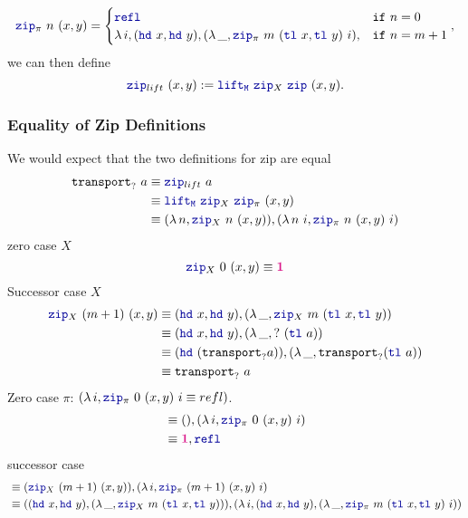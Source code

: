 \documentclass[twoside,11pt,openright]{report}
\theoremstyle{plain} %
\theoremstyle{definition}
\theoremstyle{remark}
\newcommand*{\type}[1]{\textcolor{magenta!90!black}{#1}}
\newcommand*{\unit}{\type{\textbf{1}}}
\newcommand*{\function}[1]{\textcolor{blue!60!black}{\ensuremath{\mathtt{#1}}}}
\begin{document}
\begin{equation}
  \function{zip}_{\pi}~n~(x , y) = \begin{cases} \function{refl} & \mathtt{if}~n = 0 \\ \lambda\,i,(\function{hd}~x , \function{hd}~y) , (\lambda\,\_, \function{zip}_{\pi}~m~(\function{tl}~x,\function{tl}~y)~i) , & \mathtt{if}~n = m + 1 \end{cases},
\end{equation}
we can then define
\begin{equation}
  \function{zip}_{lift}~(x , y) := \function{lift_M}~\function{zip}_X~\function{zip}~(x,y).
\end{equation}
\subsubsection{Equality of Zip Definitions}
We would expect that the two definitions for zip are equal
\begin{align}
  \texttt{transport}_{?}~a &\equiv \function{zip}_{lift}~a \\
                           &\equiv \function{lift_M}~\function{zip}_X~\function{zip}_\pi~(x,y) \\
                           &\equiv (\lambda\,n, \function{zip}_X~n~(x,y)) , (\lambda\,n~i, \function{zip}_\pi~n~(x,y)~i)
\end{align}
zero case \(X\)
\begin{equation}
  \function{zip}_X~0~(x,y) \equiv \unit
\end{equation}
Successor case \(X\)
\begin{align} 
  \function{zip}_X~(m+1)~(x,y) &\equiv (\function{hd}~x, \function{hd}~y),(\lambda\,\_,\function{zip}_X~m~(\function{tl}~x,\function{tl}~y)) \\
                               &\equiv (\function{hd}~x, \function{hd}~y),(\lambda\,\_, {?}~(\function{tl}~a)) \\
                               &\equiv (\function{hd}~(\texttt{transport}_{?} a)),(\lambda\,\_, \texttt{transport}_{?} (\function{tl}~a)) \\
                               &\equiv \mathtt{transport}_?~a \\
\end{align}
Zero case \(\pi\): \((\lambda\,i, \function{zip}_\pi~0~(x,y)~i \equiv refl)\).
\begin{align}
  &\equiv () , (\lambda\,i, \function{zip}_\pi~0~(x,y)~i) \\
  &\equiv \unit , \function{refl} \\
\end{align}
successor case
\begin{align}
  &\equiv (\function{zip}_X~(m+1)~(x,y)) , (\lambda\,i, \function{zip}_\pi~(m+1)~(x,y)~i) \\
  &\equiv ((\function{hd}~x, \function{hd}~y),(\lambda\,\_,\function{zip}_X~m~(\function{tl}~x,\function{tl}~y))) , (\lambda\,i, (\function{hd}~x, \function{hd}~y),(\lambda\,\_,\function{zip}_\pi~m~(\function{tl}~x,\function{tl}~y)~i))
\end{align}
\end{document}
